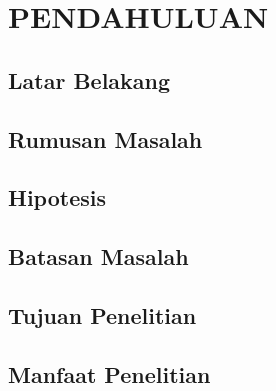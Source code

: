 \chapter{PENDAHULUAN}
\label{BAB1:pendahuluan}

\section{Latar Belakang}
\lipsum[1-2]

\section{Rumusan Masalah}
\lipsum[3]

\section{Hipotesis}
\lipsum[4]

\section{Batasan Masalah}
\lipsum[5]

\section{Tujuan Penelitian}
\lipsum[6]


\section{Manfaat Penelitian}
\lipsum[7]


